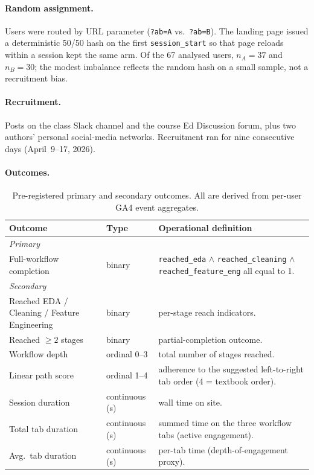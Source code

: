 \documentclass[11pt,a4paper]{article}
\begin{document}
\paragraph{Random assignment.}
Users were routed by URL parameter (\texttt{?ab=A} vs.\
\texttt{?ab=B}). The landing page issued a deterministic 50/50
hash on the first \texttt{session\_start} so that page reloads
within a session kept the same arm. Of the 67 analysed users,
$n_A=37$ and $n_B=30$; the modest imbalance reflects the random
hash on a small sample, not a recruitment bias.

\paragraph{Recruitment.}
Posts on the class Slack channel and the course Ed Discussion
forum, plus two authors' personal social-media networks.
Recruitment ran for nine consecutive days (April~9--17, 2026).

\paragraph{Outcomes.}

\begin{table}[ht]
\centering\small
\renewcommand{\arraystretch}{1.15}
\begin{tabular}{@{}p{4.0cm}p{2.3cm}p{8.4cm}@{}}
\toprule
\textbf{Outcome} & \textbf{Type} & \textbf{Operational definition} \\
\midrule
\textit{Primary} & & \\
Full-workflow completion & binary &
   \texttt{reached\_eda} $\wedge$ \texttt{reached\_cleaning}
   $\wedge$ \texttt{reached\_feature\_eng} all equal to 1. \\
\midrule
\textit{Secondary} & & \\
Reached EDA / Cleaning /
   Feature Engineering          & binary  & per-stage reach indicators. \\
Reached $\geq 2$ stages         & binary  & partial-completion outcome. \\
Workflow depth                  & ordinal 0--3 & total number of stages reached. \\
Linear path score               & ordinal 1--4 & adherence to the suggested
   left-to-right tab order (4 = textbook order). \\
Session duration                & continuous (s)  & wall time on site. \\
Total tab duration              & continuous (s)  & summed time on the three
   workflow tabs (active engagement). \\
Avg.\ tab duration              & continuous (s)  & per-tab time
   (depth-of-engagement proxy). \\
\bottomrule
\end{tabular}
\caption{Pre-registered primary and secondary outcomes. All are
derived from per-user GA4 event aggregates.}
\end{table}
\end{document}
